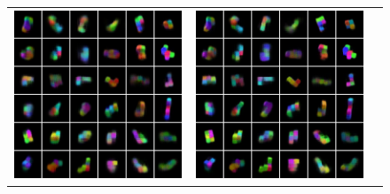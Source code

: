 \begin{figure}[tbp]
\begin{center}
\begin{tabular}{ccc}
      \begin{minipage}{0.33\linewidth}
        \begin{center}
          \includegraphics[width=\linewidth]{./figures/proposal19600.png}
        \end{center}
      \end{minipage}&
      \begin{minipage}{0.33\linewidth}
        \begin{center}
          \includegraphics[width=\linewidth]{./figures/proposal39900.png}

\end{center}
\end{minipage}
\end{tabular}
\end{center}
\end{figure}
